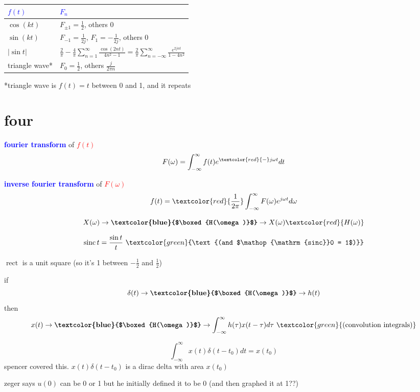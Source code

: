 \documentclass[a5paper, fleqn]{article}
\newcommand{\vocab}[1]{\textbf{\textcolor{blue}{#1}}}
\newcommand{\emf}[1]{\textcolor{red}{#1}}
\newcommand{\note}[1]{\textcolor{green}{#1}}
\newcommand{\eq}[1]{\textcolor{red}{$#1$}}
\DeclareMathOperator{\sinc}{sinc}
\DeclareMathOperator{\rect}{rect}
\begin{document}
\begin{tabular}{l | l}
  \vocab{$f(t)$} & \vocab{$F_n$}                                                                                                                                      \\
  \hline
  $\cos (kt)$    & $F_{\pm 1} = \frac{1}{2}$, others $0$                                                                                                              \\
  $\sin (kt)$    & $F_{-1} = \frac{1}{2j}$, $F_1 = -\frac{1}{2j}$, others $0$                                                                                         \\
  $|\sin t|$     & $\frac{2}{\pi} - \frac{4}{\pi} \sum_{n = 1}^\infty \frac{\cos(2nt)}{4n^2 - 1} = \frac{2}{\pi} \sum_{n = -\infty}^\infty \frac{e^{2jnt}}{1 - 4n^2}$ \\
  triangle wave* & $F_0 = \frac{1}{2}$, others $\frac{j}{2\pi n}$
\end{tabular}

*triangle wave is $f(t) = t$ between 0 and 1, and it repeats

\section*{\textcolor{primary}{four}}

\vocab{fourier transform} of \eq{f(t)}
\[F(\omega) = \int_{-\infty}^\infty f(t) e^{\emf{-}j\omega t} dt\]

\vocab{inverse fourier transform} of \eq{F(\omega)}
\[f(t) = \emf{\frac{1}{2\pi}} \int_{-\infty}^\infty F(\omega) e^{j\omega t} d\omega\]

\[X(\omega) \to \vocab{$\boxed{H(\omega)}$} \to X(\omega) \emf{H(\omega)}\]

\[\sinc t = \frac{\sin t}{t} ~ \note{\text{(and $\sinc 0 = 1$)}}\]

$\rect$ is a unit square (so it's 1 between $-\frac{1}{2}$ and $\frac{1}{2}$)

if
\[\delta(t) \to \vocab{$\boxed{H(\omega)}$} \to h(t)\]
then
\[x(t) \to \vocab{$\boxed{H(\omega)}$} \to \int_{-\infty}^\infty h(\tau) x(t - \tau) d\tau ~ \note{\text{(convolution integrals)}}\]

\[\int_{-\infty}^\infty x(t) \delta(t - t_0) dt = x(t_0)\]
spencer covered this. $x(t) \delta(t - t_0)$ is a dirac delta with area $x(t_0)$

zeger says $u(0)$ can be 0 or 1 but he initially defined it to be 0 (and then graphed it at 1??)
\end{document}
